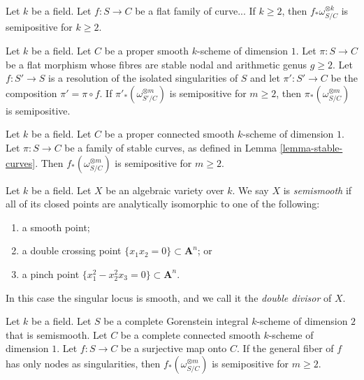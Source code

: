\begin{lemma}
Let $k$ be a field.
Let $f : S \to C$ be a flat family of curve...
If $k \geq 2$, then $f_*\omega_{S/C}^{\otimes k}$ is semipositive for $k \geq 2$.
\end{lemma}

\begin{lemma}
\label{lemma-stable-curves-semipositive-resolve}
Let $k$ be a field.
Let $C$ be a proper smooth $k$-scheme of dimension $1$.
Let $\pi : S \to C$ be a flat morphism whose fibres are stable nodal and arithmetic
genus $g \geq 2$.
Let $f : S' \to S$ is a resolution of the isolated singularities of $S$
and let $\pi' : S' \to C$ be the composition $\pi' = \pi \circ f$.
If $\pi'_*(\omega_{S'/C}^{\otimes m})$ is semipositive for $m \geq 2$, then
$\pi_*(\omega_{S/C}^{\otimes m})$ is semipositive.
\end{lemma}

\begin{lemma}[cf.\ {\cite[Theorem 4.3]{Ko90}}]
\label{lemma-stable-curves-semipositive}
Let $k$ be a field.
Let $C$ be a proper connected smooth $k$-scheme of dimension $1$.
Let $\pi : S \to C$ be a family of stable curves,
as defined in Lemma \ref{lemma-stable-curves}.
Then $f_*(\omega_{S/C}^{\otimes m})$ is semipositive for $m \geq 2$.
\end{lemma}

\begin{definition}[cf.\ {\cite[Definition 4.1(i)]{Ko90}}]
Let $k$ be a field.
Let $X$ be an algebraic variety over $k$.
We say $X$ is {\it semismooth} if all of its closed points are analytically
isomorphic to one of the following:
\begin{enumerate}
\item a smooth point;
\item a double crossing point $\{x_1x_2 = 0\} \subset \mathbf{A}^n$; or
\item a pinch point $\{x_1^2 - x_2^2x_3 = 0\} \subset \mathbf{A}^n$.
\end{enumerate}
In this case the singular locus is smooth, and we call it the {\it double
divisor} of $X$.
\end{definition}

\begin{theorem}[cf.\ {\cite[Theorem 4.3]{Ko90}}]
\label{theorem-kollar-theorem-4.3}
Let $k$ be a field.
Let $S$ be a complete Gorenstein integral $k$-scheme of dimension $2$ that is
semismooth.
Let $C$ be a complete connected smooth $k$-scheme of dimension $1$.
Let $f : S \to C$ be a surjective map onto $C$.
If the general fiber of $f$ has only nodes as singularities, %
then $f_*(\omega_{S/C}^{\otimes m})$ is semipositive for $m \ge 2$. 
\end{theorem}








